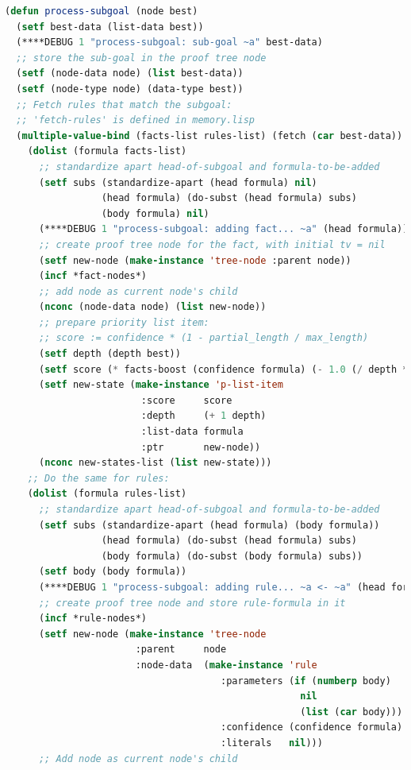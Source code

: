 \begin{lstlisting}[language=Lisp]
(defun process-subgoal (node best)
  (setf best-data (list-data best))
  (****DEBUG 1 "process-subgoal: sub-goal ~a" best-data)
  ;; store the sub-goal in the proof tree node
  (setf (node-data node) (list best-data))
  (setf (node-type node) (data-type best))
  ;; Fetch rules that match the subgoal:
  ;; 'fetch-rules' is defined in memory.lisp
  (multiple-value-bind (facts-list rules-list) (fetch (car best-data))
    (dolist (formula facts-list)
      ;; standardize apart head-of-subgoal and formula-to-be-added
      (setf subs (standardize-apart (head formula) nil)
                 (head formula) (do-subst (head formula) subs)
                 (body formula) nil)
      (****DEBUG 1 "process-subgoal: adding fact... ~a" (head formula))
      ;; create proof tree node for the fact, with initial tv = nil
      (setf new-node (make-instance 'tree-node :parent node))
      (incf *fact-nodes*)
      ;; add node as current node's child
      (nconc (node-data node) (list new-node))
      ;; prepare priority list item:
      ;; score := confidence * (1 - partial_length / max_length)
      (setf depth (depth best))
      (setf score (* facts-boost (confidence formula) (- 1.0 (/ depth *max-depth*))))
      (setf new-state (make-instance 'p-list-item
                        :score     score
                        :depth     (+ 1 depth)
                        :list-data formula
                        :ptr       new-node))
      (nconc new-states-list (list new-state)))
    ;; Do the same for rules:
    (dolist (formula rules-list)
      ;; standardize apart head-of-subgoal and formula-to-be-added
      (setf subs (standardize-apart (head formula) (body formula))
                 (head formula) (do-subst (head formula) subs)
                 (body formula) (do-subst (body formula) subs))
      (setf body (body formula))
      (****DEBUG 1 "process-subgoal: adding rule... ~a <- ~a" (head formula) body)
      ;; create proof tree node and store rule-formula in it
      (incf *rule-nodes*)
      (setf new-node (make-instance 'tree-node
                       :parent     node
                       :node-data  (make-instance 'rule
                                      :parameters (if (numberp body)    ; bodyless rule?
                                                    nil
                                                    (list (car body)))  ; first element = theta
                                      :confidence (confidence formula)
                                      :literals   nil)))
      ;; Add node as current node's child

\end{lstlisting}
